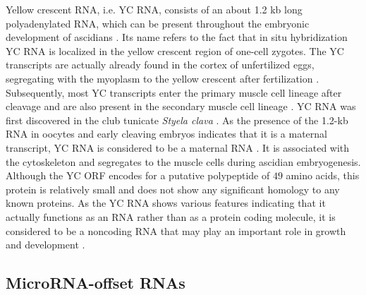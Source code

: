 \documentclass[graybox]{svmult}
\begin{document}
Yellow crescent RNA, i.e. YC RNA, consists of an about 1.2 kb long 
polyadenylated 
RNA, which can be present throughout the embryonic development of ascidians 
\citep{Swalla1995}. Its name refers to the fact that in situ hybridization YC 
RNA is localized in the yellow crescent region of one-cell 
zygotes. The YC transcripts are actually already found in the cortex of 
unfertilized eggs, segregating with the myoplasm to the yellow crescent after 
fertilization \citep{Swalla1995}. Subsequently, most YC transcripts enter the 
primary muscle cell lineage after cleavage and are also present in the 
secondary muscle cell lineage \citep{Swalla1995}. YC RNA was first 
discovered in the club tunicate \textit{Styela clava} \citep{Swalla1995}. As the 
presence 
of the 1.2-kb RNA in oocytes and early cleaving embryos indicates that it is a 
maternal transcript, YC RNA is considered to be a maternal RNA 
\citep{Swalla1995}. It is associated with the cytoskeleton and segregates to 
the muscle cells during ascidian embryogenesis. Although the YC ORF encodes for 
a putative polypeptide of $49$ amino acids, this protein is relatively small 
and does not show any significant homology to any known proteins. As the YC RNA 
shows various features indicating that it actually functions as an RNA rather 
than as a protein coding molecule, it is considered to be a noncoding RNA that 
may play an important role in growth and development \citep{Swalla1995}.

\subsection{MicroRNA-offset RNAs}
\end{document}

